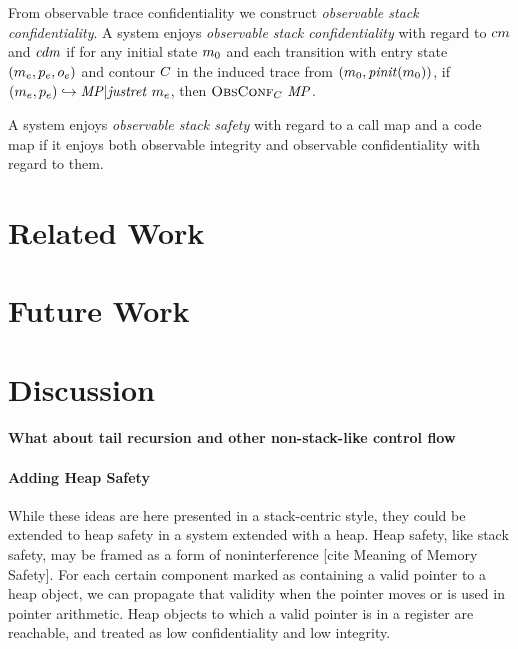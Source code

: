 \documentclass[acmsmall,review,anonymous]{acmart}\settopmatter{printfolios=true,printccs=false,printacmref=false}
\begin{document}

      From observable trace confidentiality we construct {\em observable stack
      confidentiality}. A system enjoys {\em observable stack confidentiality}
      with regard to \(cm\) and \(\mathit{cdm}\) if for any initial state
      \(m_0\) and each transition with entry state
      \((m_e,p_e,o_e)\) and contour \(C\) in the
      induced trace from \((m_0,\mathit{pinit}(m_0))\), if
      \((m_e,p_e) \hookrightarrow \mathit{MP} | \mathit{justret}\ m_e\),
      then \(\text{\sc ObsConf}_C ~ \mathit{MP}\).


      A system enjoys {\em observable stack safety} with regard to a call map
      and a code map if it enjoys both observable integrity and observable
      confidentiality with regard to them.


\section{Related Work}
\label{sec:relwork}

\section{Future Work}
\label{sec:future}

\section{Discussion}

\label{sec:disc}


  \paragraph{What about tail recursion and other non-stack-like control flow}


  \paragraph{Adding Heap Safety}

    While these ideas are here presented in a stack-centric style, they could
    be extended to heap safety in a system extended with a heap. Heap safety,
    like stack safety, may be framed as a form of noninterference
    [cite Meaning of Memory Safety]. For each certain component marked as
    containing a valid pointer to a heap object, we can propagate that
    validity when the pointer moves or is used in pointer arithmetic. Heap
    objects to which a valid pointer is in a register are reachable, and
    treated as low confidentiality and low integrity.
\end{document}
